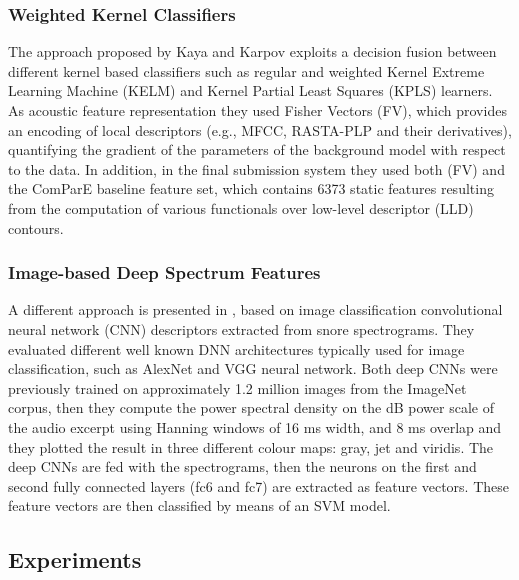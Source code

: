 \subsubsection{Weighted Kernel Classifiers}
The approach  proposed by Kaya and Karpov \cite{kaya2017introducing} exploits a decision fusion between different kernel based classifiers such as regular and weighted Kernel Extreme Learning Machine (KELM) and Kernel Partial Least Squares (KPLS) learners.
As acoustic feature representation they used Fisher Vectors (FV), which provides an encoding of local descriptors (e.g., MFCC, RASTA-PLP and their derivatives), quantifying the gradient of the parameters of the background model with respect to the data. In addition, in the final submission system they used both (FV) and the ComParE baseline feature set, which contains 6373 static features resulting from the computation of various functionals over low-level descriptor (LLD) contours.  

\subsubsection{Image-based Deep Spectrum Features}
A different approach is presented in \cite{amiriparian2017snore}, based on image classification convolutional neural network (CNN) descriptors extracted from snore spectrograms. They evaluated different well known DNN architectures typically used for image classification, such as AlexNet and VGG neural network. Both deep CNNs were previously trained on approximately 1.2 million images from the ImageNet corpus, then they compute the power spectral density on the dB power scale of the audio excerpt using Hanning windows of 16 ms width, and 8 ms overlap and they plotted the result in three different colour maps: gray, jet and viridis. The deep CNNs are fed with the spectrograms, then the neurons on the first and second fully connected layers (fc6 and fc7) are extracted as feature vectors. These feature vectors are then classified by means of an SVM model. 

\subsection{Experiments}

